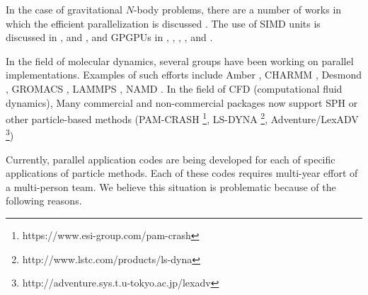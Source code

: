 
In the case of gravitational $N$-body problems, there are a number of
works in which the efficient parallelization is
discussed \citep{1994JCoPh.111..136S, 1996NewA....1..133D,
2004PASJ...56..521M, 2009PASJ...61.1319I,
Ishiyama:2012:PAN:2388996.2389003}.  The use of SIMD units is
discussed in \citet{2006NewA...12..169N}, \citet{2012NewA...17...82T}
and \citet{2013NewA...19...74T}, and GPGPUs
in \citet{2009NewA...14..630G}, \citet{hamada2009novel}, \citet{Hamada:2009:THN:1654059.1654123}, \citet{Hamada:2010:TAN:1884643.1884644}, \citet{2012JCoPh.231.2825B}
and
\citet{Bedorf:2014:PGT:2683593.2683600}.

In the field of molecular dynamics, several groups have been working
on parallel implementations. Examples of such efforts include
Amber \citep{2015AMBER}, CHARMM \citep{2009CHARMM},
Desmond \citep{GB14}, GROMACS \citep{2014GROMACS},
LAMMPS \citep{1995LAMMPS}, NAMD \citep{2005NAMD}. In the field of CFD
(computational fluid dynamics), Many commercial and non-commercial
packages now support SPH or other particle-based methods
(PAM-CRASH \footnote{https://www.esi-group.com/pam-crash},
LS-DYNA \footnote{http://www.lstc.com/products/ls-dyna},
Adventure/LexADV \footnote{http://adventure.sys.t.u-tokyo.ac.jp/lexadv})


Currently, parallel application codes are being developed for each of
specific applications of particle methods. Each of these codes
requires multi-year effort of a multi-person team. We believe this
situation is problematic because of the following reasons.

